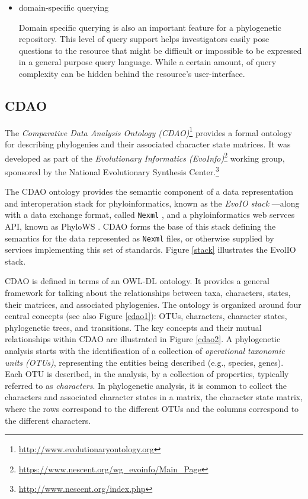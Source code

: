 \documentclass[10pt]{bmc_article}
\newenvironment{bmcformat}{\fussy\setboolean{publ}{true}}{\fussy}
\begin{document}
\begin{bmcformat}
\begin{itemize}
\item domain-specific querying

Domain specific querying is also an important feature for a phylogenetic repository.\cite{bibe.pdf}
This level of query support helps investigators easily pose questions to the resource that might be
difficult or impossible to be expressed in a general purpose query language. While a certain amount, of
query complexity can be hidden behind the resource's user-interface.



\end{itemize}



\subsection*{CDAO}

  The \emph{Comparative Data Analysis Ontology (CDAO)}\footnote{\url{http://www.evolutionaryontology.org}} \cite{cdao-evol} provides a formal ontology
  for describing phylogenies and their associated
  character state matrices. It was developed as part of the 
  \emph{Evolutionary Informatics (EvoInfo)}\footnote{\url{https://www.nescent.org/wg_evoinfo/Main_Page}} working group, sponsored by 
  the National Evolutionary Synthesis Center.\footnote{\url{http://www.nescent.org/index.php}}
  
  The CDAO ontology provides the semantic component of a data representation and interoperation stack for phyloinformatics, 
  known as the  \emph{EvoIO stack} \cite{evoio}---along with a data exchange format, called {\tt Nexml} \cite{nexml}, and 
  a phyloinformatics web servces API, known as PhyloWS \cite{phylows}. CDAO forms
  the base of this stack defining the semantics for the data represented as {\tt Nexml} files, or otherwise supplied by
  services implementing this set of standards. Figure \ref{stack} illustrates the EvolIO 
  stack.



  CDAO is defined in terms of an OWL-DL ontology. It provides a general framework
  for talking about the relationships between taxa, characters, states, their matrices, and associated 
  phylogenies.   The ontology is organized around four central concepts (see also
	Figure \ref{cdao1}): OTUs, characters, character states, phylogenetic trees, and
transitions. The key concepts and their mutual relationships
within CDAO are illustrated in Figure \ref{cdao2}.
A phylogenetic analysis starts with the identification of a
collection of \emph{operational taxonomic units (OTUs)}, representing
the entities being described (e.g., species, genes). Each OTU is
described, in the analysis, by a collection of properties, typically
referred to as \emph{characters}. In phylogenetic analysis,
it is common to collect the characters and associated character states in a matrix, the
character state matrix, where the rows correspond to the different
OTUs and the columns correspond to the different characters.
  

\end{bmcformat}
\end{document}
